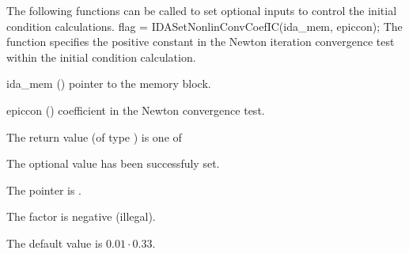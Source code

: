 {The following functions can be called to set optional inputs to control the initial 
condition calculations.
{
flag = IDASetNonlinConvCoefIC(ida\_mem, epiccon);
}
{
  The function  specifies the positive constant in
  the Newton iteration convergence test within the initial condition calculation.
}
{
  \begin{args}
  \item[ida\_mem] ()
    pointer to the {\ida} memory block.
  \item[epiccon] ()
    coefficient in the Newton convergence test.
  \end{args}
}
{
  The return value  (of type ) is one of
  \begin{args}
  \item[\Id{IDA\_SUCCESS}] 
    The optional value has been successfuly set.
  \item[\Id{IDA\_MEM\_NULL}]
    The  pointer is .
  \item[\Id{IDA\_ILL\_INPUT}]
    The  factor is negative (illegal).
  \end{args}
}
{
  The default value is $0.01 \cdot 0.33$.

}}
